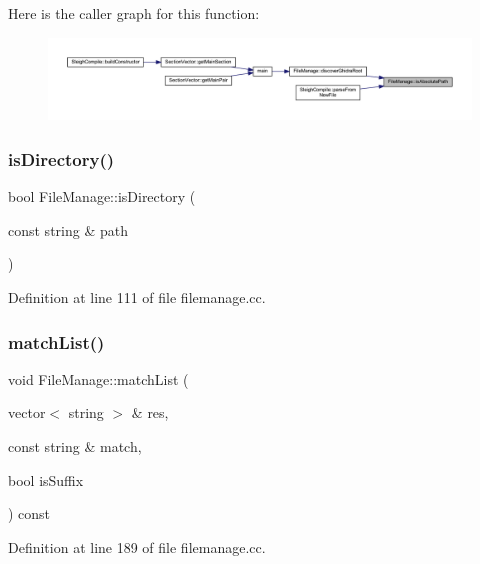 Here is the caller graph for this function\+:
\nopagebreak
\begin{figure}[H]
\begin{center}
\leavevmode
\includegraphics[width=350pt]{class_file_manage_a04c3c512ed3ab22194c34729dd2dd20e_icgraph}
\end{center}
\end{figure}
\mbox{\label{class_file_manage_af88425307be1ac649af869abbf4ac9a7}} 
\subsubsection{\texorpdfstring{isDirectory()}{isDirectory()}}
{\footnotesize\ttfamily bool File\+Manage\+::is\+Directory (\begin{DoxyParamCaption}\item[{const string \&}]{path }\end{DoxyParamCaption})\hspace{0.3cm}{\ttfamily [static]}}



Definition at line 111 of file filemanage.\+cc.

\mbox{\label{class_file_manage_aeba79cb34d9727c1660d1710fd356e30}} 
\subsubsection{\texorpdfstring{matchList()}{matchList()}}
{\footnotesize\ttfamily void File\+Manage\+::match\+List (\begin{DoxyParamCaption}\item[{vector$<$ string $>$ \&}]{res,  }\item[{const string \&}]{match,  }\item[{bool}]{is\+Suffix }\end{DoxyParamCaption}) const}



Definition at line 189 of file filemanage.\+cc.

